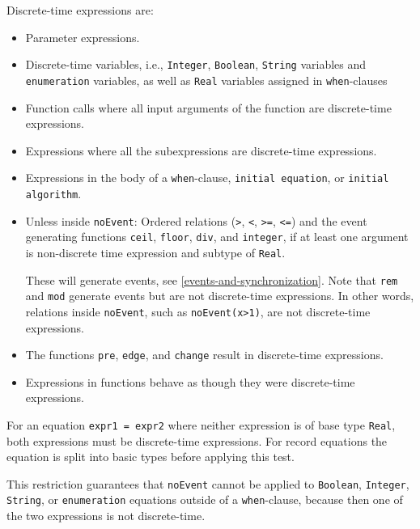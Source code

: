 Discrete-time expressions are:
\begin{itemize}
\item
  Parameter expressions.
\item
  Discrete-time variables, i.e., \lstinline!Integer!, \lstinline!Boolean!, \lstinline!String! variables and
  \lstinline!enumeration! variables, as well as \lstinline!Real! variables assigned in
  \lstinline!when!-clauses
\item
  Function calls where all input arguments of the function are
  discrete-time expressions.
\item
  Expressions where all the subexpressions are discrete-time
  expressions.
\item
  Expressions in the body of a \lstinline!when!-clause, \lstinline!initial equation!, or \lstinline!initial algorithm!.
\item
  Unless inside \lstinline!noEvent!: Ordered relations (\lstinline!>!, \lstinline!<!, \lstinline!>=!, \lstinline!<=!) and the event
  generating functions \lstinline!ceil!, \lstinline!floor!, \lstinline!div!, and \lstinline!integer!, if at least one
  argument is non-discrete time expression and subtype of \lstinline!Real!.
  \begin{nonnormative}
  These will generate events, see \cref{events-and-synchronization}.  Note that \lstinline!rem! and \lstinline!mod! generate events but are not discrete-time
  expressions. In other words, relations inside \lstinline!noEvent!, such as \lstinline!noEvent(x>1)!, are not discrete-time expressions.
  \end{nonnormative}
\item
  The functions \lstinline!pre!, \lstinline!edge!, and \lstinline!change! result in discrete-time
  expressions.
\item
  Expressions in functions behave as though they were discrete-time
  expressions.
\end{itemize}

For an equation \lstinline!expr1 = expr2! where neither expression is of base type
\lstinline!Real!, both expressions must be discrete-time expressions. For record
equations the equation is split into basic types before applying this
test.

\begin{nonnormative}
This restriction guarantees that \lstinline!noEvent! cannot be applied to \lstinline!Boolean!, \lstinline!Integer!, \lstinline!String!, or \lstinline!enumeration!
equations outside of a \lstinline!when!-clause, because then one of the two expressions is not discrete-time.
\end{nonnormative}

